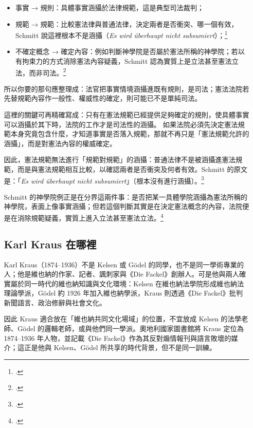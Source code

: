 \begin{itemize}
\tightlist
\item
  事實 → 規則：具體事實涵攝於法律規範，這是典型司法裁判；
\item
  規範 → 規範：比較憲法律與普通法律，決定兩者是否衝突、哪一個有效，Schmitt 說這裡根本不是涵攝（\emph{Es wird überhaupt nicht subsumiert}）；\footcites[43]{schmitt1931}[114]{schmitt2015}
\item
  不確定概念 → 確定內容：例如判斷神學院是否屬於憲法所稱的神學院；若以有拘束力的方式消除憲法內容疑義，Schmitt 認為實質上是立法甚至憲法立法，而非司法。\footcites[44--45]{schmitt1931}[116--117]{schmitt2015}
\end{itemize}

所以你要的那句應整理成：法官把事實情境涵攝進既有規則，是司法；憲法法院若先替規範內容作一般性、權威性的確定，則可能已不是單純司法。

這裡的關鍵可再精確寫成：只有在憲法規範已經提供足夠確定的規則，使具體事實可以涵攝於其下時，法院的工作才是司法性的涵攝。 如果法院必須先決定憲法規範本身究竟包含什麼，才知道事實是否落入規範，那就不再只是「憲法規範允許的涵攝」，而是對憲法內容的權威確定。

因此，憲法規範無法進行「規範對規範」的涵攝：普通法律不是被涵攝進憲法規範，而是與憲法規範相互比較，以確認兩者是否衝突及何者有效。Schmitt 的原文是：「\emph{Es wird überhaupt nicht subsumiert}」〔根本沒有進行涵攝〕。\footcites[43]{schmitt1931}[114]{schmitt2015}

Schmitt 的神學院例正是在分界這兩件事：是否把某一具體學院涵攝為憲法所稱的神學院，表面上像事實涵攝；但若這個判斷其實是在決定憲法概念的內容，法院便是在消除規範疑義，實質上進入立法甚至憲法立法。\footcites[114, 116--117]{schmitt2015}[43--45]{schmitt1931}

\subsection{Karl Kraus 在哪裡}

Karl Kraus（1874--1936）不是 Kelsen 或 Gödel 的同學，也不是同一學術專業的人；他是維也納的作家、記者、諷刺家與《Die Fackel》創辦人。可是他與兩人確實屬於同一時代的維也納知識與文化環境：Kelsen 在維也納法學院形成維也納法理論學派，Gödel 約 1926 年加入維也納學派，Kraus 則透過《Die Fackel》批判新聞語言、政治修辭與社會文化。

因此 Kraus 適合放在「維也納共同文化場域」的位置，不宜放成 Kelsen 的法學老師、Gödel 的邏輯老師，或與他們同一學派。奧地利國家圖書館將 Kraus 定位為 1874--1936 年人物，並記載《Die Fackel》作為其反對煽情報刊與語言敗壞的媒介；這正是他與 Kelsen、Gödel 所共享的時代背景，但不是同一訓練。

